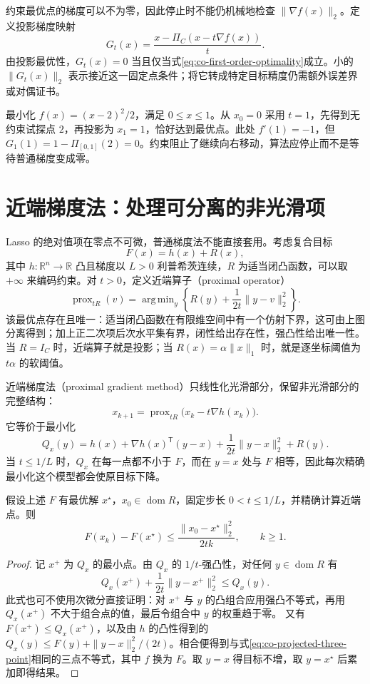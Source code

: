 \documentclass[UTF8,12pt,a4paper,fontset=fandol]{ctexbook}
\begin{document}
约束最优点的梯度可以不为零，因此停止时不能仍机械地检查 $\|\nabla f(x)\|_2$。定义投影梯度映射
\[
 G_t(x)=\frac{x-\Pi_C(x-t\nabla f(x))}{t}.
\]
由投影最优性，$G_t(x)=0$ 当且仅当式\eqref{eq:co-first-order-optimality}成立。小的 $\|G_t(x)\|_2$ 表示接近这一固定点条件；将它转成特定目标精度仍需额外误差界或对偶证书。

\begin{example}[边界最优点的梯度不消失]
最小化 $f(x)=(x-2)^2/2$，满足 $0\leq x\leq1$。从 $x_0=0$ 采用 $t=1$，先得到无约束试探点 $2$，再投影为 $x_1=1$，恰好达到最优点。此处 $f'(1)=-1$，但 $G_1(1)=1-\Pi_{[0,1]}(2)=0$。约束阻止了继续向右移动，算法应停止而不是等待普通梯度变成零。
\end{example}

\section{近端梯度法：处理可分离的非光滑项}
\label{sec:co-proximal-gradient}

Lasso 的绝对值项在零点不可微，普通梯度法不能直接套用。考虑复合目标
\[
 F(x)=h(x)+R(x),
\]
其中 $h:\mathbb R^n\to\mathbb R$ 凸且梯度以 $L>0$ 利普希茨连续，$R$ 为适当闭凸函数，可以取 $+\infty$ 来编码约束。对 $t>0$，定义近端算子（proximal operator）
\[
 \operatorname{prox}_{tR}(v)
 =\mathop{\mathrm{arg\,min}}_y
 \left\{R(y)+\frac1{2t}\|y-v\|_2^2\right\}.
\]
该最优点存在且唯一：适当闭凸函数在有限维空间中有一个仿射下界，这可由上图分离得到；加上正二次项后次水平集有界，闭性给出存在性，强凸性给出唯一性。当 $R=I_C$ 时，近端算子就是投影；当 $R(x)=\alpha\|x\|_1$ 时，就是逐坐标阈值为 $t\alpha$ 的软阈值。

近端梯度法（proximal gradient method）只线性化光滑部分，保留非光滑部分的完整结构：
\begin{equation}
 x_{k+1}=\operatorname{prox}_{tR}\bigl(x_k-t\nabla h(x_k)\bigr).
 \label{eq:co-proximal-gradient}
\end{equation}
它等价于最小化
\[
 Q_x(y)=h(x)+\nabla h(x)^{\mathsf T}(y-x)
             +\frac1{2t}\|y-x\|_2^2+R(y).
\]
当 $t\leq1/L$ 时，$Q_x$ 在每一点都不小于 $F$，而在 $y=x$ 处与 $F$ 相等，因此每次精确最小化这个模型都会使原目标下降。

\begin{proposition}[近端梯度法的基本收敛界]
假设上述 $F$ 有最优解 $x^\star$，$x_0\in\operatorname{dom}R$，固定步长 $0<t\leq1/L$，并精确计算近端点。则
\[
 F(x_k)-F(x^\star)\leq\frac{\|x_0-x^\star\|_2^2}{2tk},
 \qquad k\geq1.
\]
\end{proposition}
\begin{proof}
记 $x^+$ 为 $Q_x$ 的最小点。由 $Q_x$ 的 $1/t$-强凸性，对任何 $y\in\operatorname{dom}R$ 有
\[
 Q_x(x^+)+\frac1{2t}\|y-x^+\|_2^2\leq Q_x(y).
\]
此式也可不使用次微分直接证明：对 $x^+$ 与 $y$ 的凸组合应用强凸不等式，再用 $Q_x(x^+)$ 不大于组合点的值，最后令组合中 $y$ 的权重趋于零。
又有 $F(x^+)\leq Q_x(x^+)$，以及由 $h$ 的凸性得到的
$Q_x(y)\leq F(y)+\|y-x\|_2^2/(2t)$。相合便得到与式\eqref{eq:co-projected-three-point}相同的三点不等式，其中 $f$ 换为 $F$。取 $y=x$ 得目标不增，取 $y=x^\star$ 后累加即得结果。
\end{proof}
\end{document}
